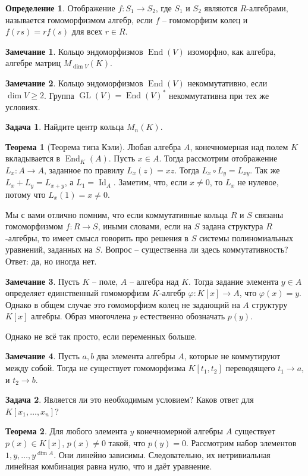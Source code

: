 \documentclass[10pt,a4paper,oneside]{book} %
\theoremstyle{definition}
\newtheorem*{rem}{Замечание}
\newtheorem{zad}{Задача}
\newtheorem*{defn}{Определение}
\newtheorem{thm}{Теорема}
\newcommand{\id}{\operatorname{Id}}
\newcommand{\End}{\operatorname{End}}
\newcommand{\GL}{\operatorname{GL}}
\def\ffi{\varphi}
\def\thrm{\begin{thm}}
\def\ethrm{\end{thm}}
\def\dfn{\begin{defn}}
\def\edfn{\end{defn}}
\def\zd{\begin{zad}}
\def\ezd{\end{zad}}
\def\rm{\begin{rem}}
\def\erm{\end{rem}}
\begin{document}
\dfn Отображение $f \colon S_1 \to S_2$, где $S_1$ и $S_2$ являются $R$-алгебрами,
называется гомоморфизмом алгебр, если $f$ -- гомоморфизм колец и $f(rs)=rf(s)$ для всех $r \in R$.
\edfn



\rm Кольцо эндоморфизмов $\End(V)$  изоморфно, как алгебра, алгебре матриц $M_{\dim V}(K)$.
\erm

\rm Кольцо эндоморфизмов $\End(V)$ некоммутативно, если $\dim V \geq 2$. Группа $\GL(V)=\End(V)^*$ некоммутативна при тех же условиях.
\erm

\zd Найдите центр кольца $M_n(K)$.
\ezd






\thrm[Теорема типа Кэли] Любая алгебра $A$, конечномерная над полем $K$ вкладывается в $\End_K(A)$.
\proof Пусть $x\in A$. Тогда рассмотрим отображение $L_x \colon A \to A$, заданное по правилу $L_x(z)=xz$. Тогда $L_x\circ L_y=L_{xy}$. Так же $L_x+L_y=L_{x+y}$, а $L_1=\id_A$. Заметим, что, если $x\neq 0$, то $L_x$ не нулевое, потому что $L_x(1)=x\neq 0$.
\endproof
\ethrm

Мы с вами отлично помним, что если коммутативные кольца $R$ и $S$ связаны гомоморфизмом $f\colon R \to S$, иными словами, если на $S$ задана структура $R$-алгебры, то имеет смысл говорить про решения в $S$ системы полиномиальных уравнений, заданных на $S$. Вопрос -- существенна ли здесь коммутативность? Ответ: да, но иногда нет.

\rm
Пусть $K$ -- поле, $A$ -- алгебра над $K$. Тогда задание элемента $y \in A$ определяет единственный гомоморфизм $K$-алгебр $\ffi \colon K[x]\to A$, что $\ffi(x)= y$. Однако в общем случае это  гомоморфизм колец не задающий на $A$ структуру $K[x]$ алгебры. Образ многочлена $p$ естественно обозначать $p(y)$.
\erm

Однако не всё так просто, если переменных больше.

\rm Пусть $a,b$ два элемента алгебры $A$, которые не коммутируют между собой. Тогда не существует гомоморфизма $K[t_1,t_2]$ переводящего $t_1\to a$, и $t_2 \to b$.
\erm

\zd Является ли это необходимым условием? Каков ответ для $K[x_1,\dots,x_n]$?
\ezd




\thrm Для любого элемента $y$ конечномерной алгебры $A$ существует $p(x)\in K[x]$, $p(x)\neq 0$ такой, что $p(y)=0$.
\proof Рассмотрим набор элементов $1,y,\dots, y^{\dim A}$. Они линейно зависимы. Следовательно, их нетривиальная линейная комбинация равна нулю, что и даёт уравнение.
\endproof
\ethrm
\end{document}
